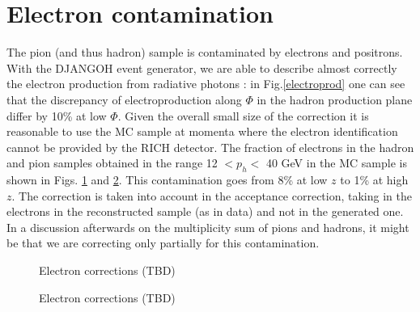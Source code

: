 \section{Electron contamination}

The pion (and thus hadron) sample is contaminated by electrons and positrons. With the DJANGOH event generator, we are able to describe almost correctly the electron production from radiative photons : in Fig.\ref{electroprod} one can see that the discrepancy of electroproduction along $\Phi$ in the hadron production plane differ by 10\% at low $\Phi$. Given the overall small size of the correction it is reasonable to use the MC sample at momenta where the electron identification cannot be provided by the RICH detector. The fraction of electrons in the hadron and pion samples obtained in the range 12 $< p_h <$ 40 GeV in the MC sample is shown in Figs. \ref{pic:ehad} and \ref{pic:epi}. This contamination goes from 8\% at low $z$ to 1\% at high $z$. The correction is taken into account in the acceptance correction, taking in the electrons in the reconstructed sample (as in data) and not in the generated one. In a discussion afterwards on the multiplicity sum of pions and hadrons, it might be that we are correcting only partially for this contamination.

\begin{figure}[!]
	\caption{Electron corrections (TBD)}
	\label{pic:ehad}
\end{figure}

\begin{figure}[!]
	\caption{Electron corrections (TBD)}
	\label{pic:epi}
\end{figure}
